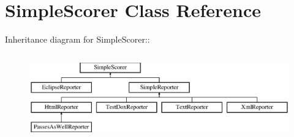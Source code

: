 \hypertarget{class_simple_scorer}{
\section{SimpleScorer Class Reference}
\label{class_simple_scorer}
}
Inheritance diagram for SimpleScorer::\begin{figure}[H]
\begin{center}
\leavevmode
\includegraphics[height=3.78378cm]{class_simple_scorer}
\end{center}
\end{figure}
